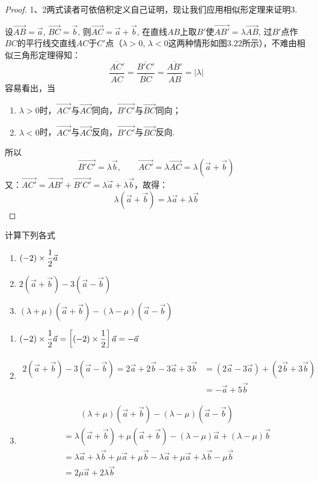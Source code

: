 \begin{proof}
1、2两式读者可依倍积定义自己证明，现让我们应用相似形定理来证明3.

设$\Vec{AB}=\vec{a}$, $\Vec{BC}=\vec{b}$, 则$\Vec{AC}=\vec{a}+\vec{b}$, 在直线$AB$上取$B'$使$\Vec{AB'}=\lambda\Vec{AB}$, 过$B'$点作$BC$的平行线交直线$AC$于$C'$点（$\lambda>0$, $\lambda<0$这两种情形如图3.22所示），不难由相似三角形定理得知：
\[\frac{\overline{AC'}}{\overline{AC}}=\frac{\overline{B'C'}}{\overline{BC}}=\frac{\overline{AB'}}{\overline{AB}}=|\lambda|\]
容易看出，当
\begin{enumerate}
    \item $\lambda>0$时，$\Vec{AC'}$与$\Vec{AC}$同向，$\Vec{B'C'}$与$\Vec{BC}$同向；
    \item $\lambda<0$时，$\Vec{AC'}$与$\Vec{AC}$反向，$\Vec{B'C'}$与$\Vec{BC}$反向. 
\end{enumerate}
所以
\[\Vec{B'C'}=\lambda\vec{b},\qquad \Vec{AC'}=\lambda\Vec{AC}=\lambda\left(\vec{a}+\vec{b}\right)\]
又：$\Vec{AC'}=\Vec{AB'}+\Vec{B'C'}=\lambda \vec{a}+\lambda\vec{b}$，故得：
\[\lambda\left(\vec{a}+\vec{b}\right)=\lambda \vec{a}+\lambda\vec{b}\]
\end{proof}

\begin{example}
计算下列各式
\begin{enumerate}
    \item $(-2)\times\dfrac{1}{2}\vec{a}$
    \item $2\left(\vec{a}+\vec{b}\right)-3\left(\vec{a}-\vec{b}\right)$
    \item $(\lambda+\mu)\left(\vec{a}+\vec{b}\right)-(\lambda-\mu)\left(\vec{a}-\vec{b}\right)$
\end{enumerate}
\end{example}

\begin{solution}
\begin{enumerate}
    \item $(-2)\times\dfrac{1}{2}\vec{a}=\left[(-2)\times\dfrac{1}{2}\right]\vec{a}=-\vec{a}$
    \item \[\begin{split}
        2\left(\vec{a}+\vec{b}\right)-3\left(\vec{a}-\vec{b}\right)=2\vec{a}+2\vec{b}-3\vec{a}+3\vec{b}&=\left(2\vec{a}-3\vec{a}\right)+\left(2\vec{b}+3\vec{b}\right)\\
        &=-\vec{a}+5\vec{b}
    \end{split}  \]
    \item \[\begin{split}
 &\qquad        (\lambda+\mu)\left(\vec{a}+\vec{b}\right)-(\lambda-\mu)\left(\vec{a}-\vec{b}\right)\\
&=\lambda \left(\vec{a}+\vec{b}\right)+\mu \left(\vec{a}+\vec{b}\right)-(\lambda-\mu)\vec{a}+(\lambda-\mu)\vec{b}\\
&=\lambda\vec{a}+\lambda \vec{b}+\mu \vec{a}+\mu \vec{b}-\lambda\vec{a}+\mu\vec{a}+\lambda\vec{b}-\mu \vec{b}\\
&=2\mu \vec{a}+2\lambda \vec{b}
\end{split}
\]
\end{enumerate}    
\end{solution}


